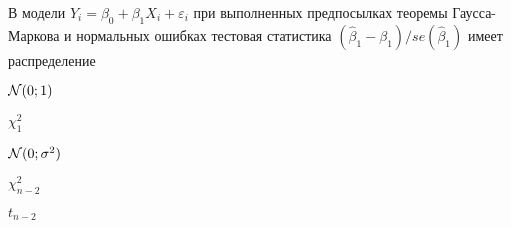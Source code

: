 
\begin{question}
В модели \(Y_i = \beta_0 + \beta_1 X_i + \varepsilon_i\) при выполненных
предпосылках теоремы Гаусса-Маркова и нормальных ошибках тестовая
статистика \((\hat\beta_1 - \beta_1)/se(\hat\beta_1)\) имеет
распределение
\begin{answerlist}
  \item \(\mathcal{N}(0;1)\)
  \item \(\chi^2_1\)
  \item \(\mathcal{N}(0;\sigma^2)\)
  \item \(\chi^2_{n-2}\)
  \item \(t_{n-2}\)
\end{answerlist}
\end{question}


